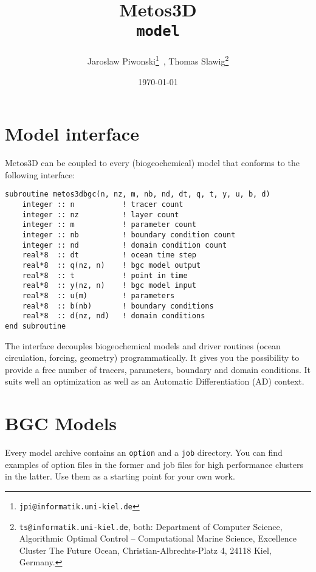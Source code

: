 \documentclass{article}
\begin{document}
%
%
\title{
Metos3D \\
\medskip
\texttt{model}
}
\author{
Jaroslaw Piwonski\thanks{\texttt{jpi@informatik.uni-kiel.de}} \,,
Thomas Slawig\thanks{\texttt{ts@informatik.uni-kiel.de},
both: Department of Computer Science, Algorithmic Optimal Control -- Computational Marine Science,
Excellence Cluster The Future Ocean, Christian-Albrechts-Platz 4, 24118 Kiel, Germany.}
}
\date{\today}
\maketitle

%
%
\section{Model interface}

Metos3D can be coupled to every (biogeochemical) model that conforms to the following interface:

\begin{verbatim}
subroutine metos3dbgc(n, nz, m, nb, nd, dt, q, t, y, u, b, d)
    integer :: n           ! tracer count
    integer :: nz          ! layer count
    integer :: m           ! parameter count
    integer :: nb          ! boundary condition count
    integer :: nd          ! domain condition count
    real*8  :: dt          ! ocean time step
    real*8  :: q(nz, n)    ! bgc model output
    real*8  :: t           ! point in time
    real*8  :: y(nz, n)    ! bgc model input
    real*8  :: u(m)        ! parameters
    real*8  :: b(nb)       ! boundary conditions
    real*8  :: d(nz, nd)   ! domain conditions
end subroutine
\end{verbatim}

The interface decouples biogeochemical models and driver routines
(ocean circulation, forcing, geometry) programmatically.
%
It gives you the possibility to provide a free number of tracers,
parameters, boundary and domain conditions. It suits well an
optimization as well as an Automatic Differentiation (AD) context.
%


%
%
\section{BGC Models}

Every model archive contains an \texttt{option} and a \texttt{job}
directory. You can find examples of option files in the former
and job files for high performance clusters in the latter.
Use them as a starting point for your own work.
\end{document}
